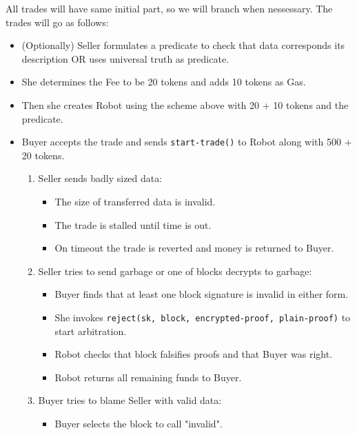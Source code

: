 All trades will have same initial part, so we will branch when nessessary.
The trades will go as follows:
\begin{itemize}
  \item (Optionally) Seller formulates a predicate to check that data corresponds its description OR uses universal truth as predicate.

  \item She determines the Fee to be 20 tokens and adds 10 tokens as Gas.

  \item Then she creates Robot using the scheme above with 20 + 10 tokens and the predicate.

  \item Buyer accepts the trade and sends \verb|start-trade()| to Robot along with 500 + 20 tokens.

  \begin{enumerate}
    \item Seller sends badly sized data:
      \begin{itemize}
        \item The size of transferred data is invalid.
        \item The trade is stalled until time is out.
        \item On timeout the trade is reverted and money is returned to Buyer.
      \end{itemize}
    \item Seller tries to send garbage or one of blocks decrypts to garbage:
      \begin{itemize}
        \item Buyer finds that at least one block signature is invalid in either form.

        \item She invokes \verb|reject(sk, block, encrypted-proof, plain-proof)| to start arbitration.

        \item Robot checks that block falsifies proofs and that Buyer was right.

        \item Robot returns all remaining funds to Buyer.
      \end{itemize}
    \item Buyer tries to blame Seller with valid data:
      \begin{itemize}
        \item Buyer selects the block to call "invalid".


\end{itemize}
\end{enumerate}
\end{itemize}

